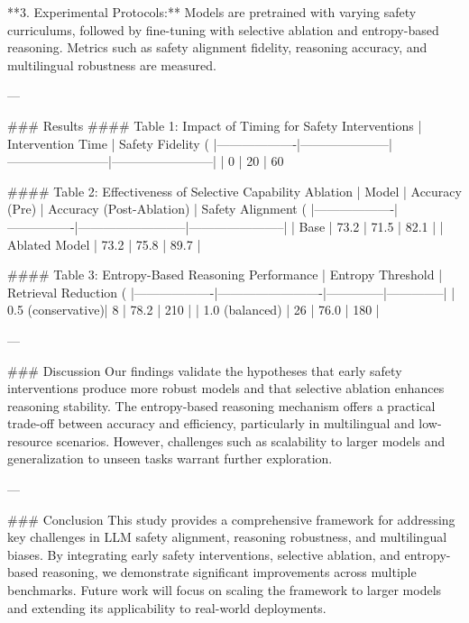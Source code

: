 **3. Experimental Protocols:**  
Models are pretrained with varying safety curriculums, followed by fine-tuning with selective ablation and entropy-based reasoning. Metrics such as safety alignment fidelity, reasoning accuracy, and multilingual robustness are measured.

---

### Results  
#### Table 1: Impact of Timing for Safety Interventions  
| Intervention Time | Safety Fidelity (%
|-------------------|---------------------|------------------------|------------------------|  
| 0%
| 20%
| 60%

#### Table 2: Effectiveness of Selective Capability Ablation  
| Model             | Accuracy (Pre) | Accuracy (Post-Ablation) | Safety Alignment (%
|-------------------|----------------|--------------------------|-----------------------|  
| Base              | 73.2           | 71.5                    | 82.1                 |  
| Ablated Model     | 73.2           | 75.8                    | 89.7                 |  

#### Table 3: Entropy-Based Reasoning Performance  
| Entropy Threshold | Retrieval Reduction (%
|-------------------|-------------------------|--------------|--------------|  
| 0.5 (conservative)| 8                       | 78.2         | 210          |  
| 1.0 (balanced)    | 26                      | 76.0         | 180          |  

---

### Discussion  
Our findings validate the hypotheses that early safety interventions produce more robust models and that selective ablation enhances reasoning stability. The entropy-based reasoning mechanism offers a practical trade-off between accuracy and efficiency, particularly in multilingual and low-resource scenarios. However, challenges such as scalability to larger models and generalization to unseen tasks warrant further exploration.

---

### Conclusion  
This study provides a comprehensive framework for addressing key challenges in LLM safety alignment, reasoning robustness, and multilingual biases. By integrating early safety interventions, selective ablation, and entropy-based reasoning, we demonstrate significant improvements across multiple benchmarks. Future work will focus on scaling the framework to larger models and extending its applicability to real-world deployments.

